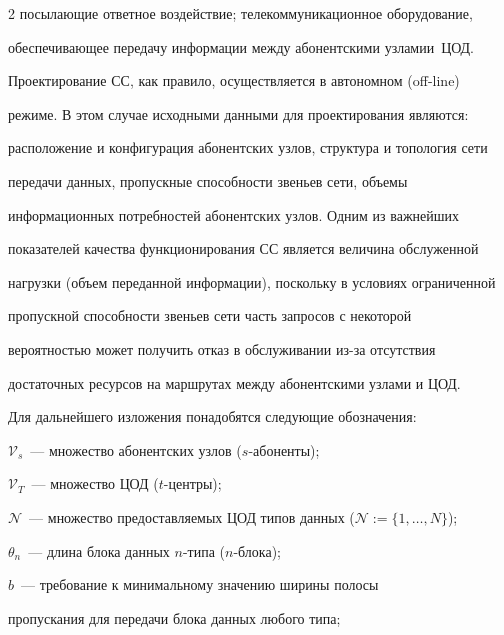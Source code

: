 \begin{multicols}{2}
по\-сылающие ответное воздействие; телекомму\-ни\-кационное обору\-до\-ва\-ние, 


обеспечивающее передачу информации между абонентскими узлами\linebreak и~ЦОД.


  


  Проектирование СС, как правило, осуществляется в автономном (off-line) 


режиме. В этом случае исходными данными для проектирования являются: 


расположение и конфигурация абонентских узлов, структура и топология сети 


передачи данных, пропускные способности звеньев сети, объемы 


информационных потребностей абонентских узлов. Одним из важнейших 


показателей качества функционирования СС является величина обслуженной 


нагрузки (объем переданной информации), поскольку в условиях ограниченной 


пропускной способности звеньев сети часть запросов с некоторой 


вероятностью может получить отказ в обслуживании из-за отсутствия 


достаточных ресурсов на маршрутах между абонентскими узлами и ЦОД.


  


  Для дальнейшего изложения понадобятся следующие обозначения:


\begin{description}


\item $\mathcal{V}_s$~--- множество абонентских узлов ($s$-або\-нен\-ты);


\item $\mathcal{V}_T$~--- множество ЦОД ($t$-цент\-ры);


\item $\mathcal{N}$~--- множество предоставляемых ЦОД типов данных ($\mathcal{N}:=\{1,\ldots ,N\}$);


\item $\theta_n$~--- длина блока данных $n$-ти\-па ($n$-бло\-ка);


\item $b$~--- требование к минимальному значению ширины полосы 


пропускания для передачи блока данных любого типа;



\end{description}
\end{multicols}
